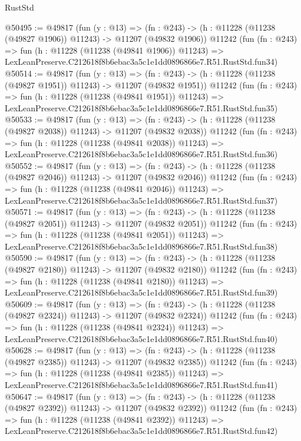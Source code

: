 \begin{lexlean}{RustStd}
\begin{coremodule}
@50495 := @49817
    (fun (y : @13) =>
    (fn : @243) -> (h : @11228 (@11238 (@49827 @1906)) @11243) -> @11207 (@49832 @1906))
    @11242
    (fun (fn : @243) =>
    fun (h : @11228 (@11238 (@49841 @1906)) @11243) =>
    LexLeanPreserve.C212618f8b6ebac3a5c1e1dd0896866e7.R51.RustStd.fun34)
@50514 := @49817
    (fun (y : @13) =>
    (fn : @243) -> (h : @11228 (@11238 (@49827 @1951)) @11243) -> @11207 (@49832 @1951))
    @11242
    (fun (fn : @243) =>
    fun (h : @11228 (@11238 (@49841 @1951)) @11243) =>
    LexLeanPreserve.C212618f8b6ebac3a5c1e1dd0896866e7.R51.RustStd.fun35)
@50533 := @49817
    (fun (y : @13) =>
    (fn : @243) -> (h : @11228 (@11238 (@49827 @2038)) @11243) -> @11207 (@49832 @2038))
    @11242
    (fun (fn : @243) =>
    fun (h : @11228 (@11238 (@49841 @2038)) @11243) =>
    LexLeanPreserve.C212618f8b6ebac3a5c1e1dd0896866e7.R51.RustStd.fun36)
@50552 := @49817
    (fun (y : @13) =>
    (fn : @243) -> (h : @11228 (@11238 (@49827 @2046)) @11243) -> @11207 (@49832 @2046))
    @11242
    (fun (fn : @243) =>
    fun (h : @11228 (@11238 (@49841 @2046)) @11243) =>
    LexLeanPreserve.C212618f8b6ebac3a5c1e1dd0896866e7.R51.RustStd.fun37)
@50571 := @49817
    (fun (y : @13) =>
    (fn : @243) -> (h : @11228 (@11238 (@49827 @2051)) @11243) -> @11207 (@49832 @2051))
    @11242
    (fun (fn : @243) =>
    fun (h : @11228 (@11238 (@49841 @2051)) @11243) =>
    LexLeanPreserve.C212618f8b6ebac3a5c1e1dd0896866e7.R51.RustStd.fun38)
@50590 := @49817
    (fun (y : @13) =>
    (fn : @243) -> (h : @11228 (@11238 (@49827 @2180)) @11243) -> @11207 (@49832 @2180))
    @11242
    (fun (fn : @243) =>
    fun (h : @11228 (@11238 (@49841 @2180)) @11243) =>
    LexLeanPreserve.C212618f8b6ebac3a5c1e1dd0896866e7.R51.RustStd.fun39)
@50609 := @49817
    (fun (y : @13) =>
    (fn : @243) -> (h : @11228 (@11238 (@49827 @2324)) @11243) -> @11207 (@49832 @2324))
    @11242
    (fun (fn : @243) =>
    fun (h : @11228 (@11238 (@49841 @2324)) @11243) =>
    LexLeanPreserve.C212618f8b6ebac3a5c1e1dd0896866e7.R51.RustStd.fun40)
@50628 := @49817
    (fun (y : @13) =>
    (fn : @243) -> (h : @11228 (@11238 (@49827 @2385)) @11243) -> @11207 (@49832 @2385))
    @11242
    (fun (fn : @243) =>
    fun (h : @11228 (@11238 (@49841 @2385)) @11243) =>
    LexLeanPreserve.C212618f8b6ebac3a5c1e1dd0896866e7.R51.RustStd.fun41)
@50647 := @49817
    (fun (y : @13) =>
    (fn : @243) -> (h : @11228 (@11238 (@49827 @2392)) @11243) -> @11207 (@49832 @2392))
    @11242
    (fun (fn : @243) =>
    fun (h : @11228 (@11238 (@49841 @2392)) @11243) =>
    LexLeanPreserve.C212618f8b6ebac3a5c1e1dd0896866e7.R51.RustStd.fun42)

\end{coremodule}
\end{lexlean}
